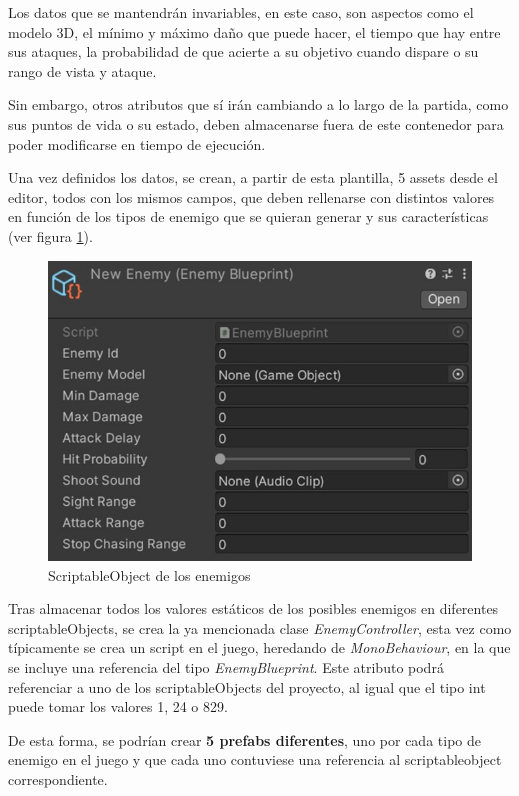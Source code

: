 Los datos que se mantendrán invariables, en este caso, son aspectos como el modelo 3D, el mínimo y máximo daño que puede hacer, el tiempo que hay entre sus ataques, la probabilidad de que acierte a su objetivo cuando dispare o su rango de vista y ataque. 

Sin embargo, otros atributos que sí irán cambiando a lo largo de la partida, como sus puntos de vida o su estado, deben almacenarse fuera de este contenedor para poder modificarse en tiempo de ejecución.

Una vez definidos los datos, se crean, a partir de esta plantilla, 5 assets desde el editor, todos con los mismos campos, que deben rellenarse con distintos valores en función de los tipos de enemigo que se quieran generar y sus características (ver figura \ref{fig:ScriptableObjectEnemigo}).
\begin{figure}[h]
	\centering
	\includegraphics[scale=0.45]{img/EnemyScriptableObject.jpg}
	\caption{ScriptableObject de los enemigos}
	\label{fig:ScriptableObjectEnemigo}
    \end{figure}
Tras almacenar todos los valores estáticos de los posibles enemigos en diferentes scriptableObjects, se crea la ya mencionada clase \textit{EnemyController}, esta vez como típicamente se crea un script en el juego, heredando de \textit{MonoBehaviour}, en la que se incluye una referencia del tipo \textit{EnemyBlueprint}. Este atributo podrá referenciar a uno de los scriptableObjects del proyecto, al igual que el tipo int puede tomar los valores 1, 24 o 829.

De esta forma, se podrían crear \textbf{5 prefabs diferentes}, uno por cada tipo de enemigo en el juego y que cada uno contuviese una referencia al scriptableobject correspondiente.

